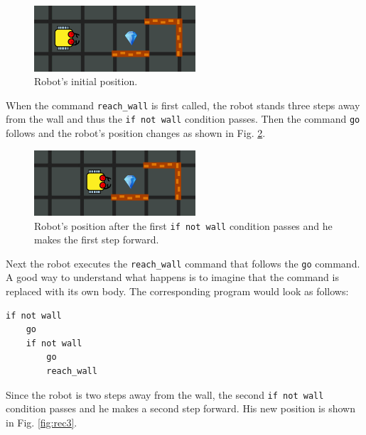 \begin{figure}[!ht]
\begin{center}
\includegraphics[width=6cm]{imgk/rec-1.png}
\end{center}
\vspace{-4mm}
\caption{Robot's initial position.}
\label{fig:rec1}
\vspace{-4mm}
\end{figure}
\noindent
When the command {\tt reach\_wall} is first called, the robot stands three steps away from the wall and 
thus the {\tt if not wall} condition passes. Then the command {\tt go} follows and the robot's 
position changes as shown in Fig. \ref{fig:rec2}. 

\begin{figure}[!ht]
\begin{center}
\includegraphics[width=6cm]{imgk/rec-2.png}
\end{center}
\vspace{-4mm}
\caption{Robot's position after the first {\tt if not wall} condition passes and he makes the first step forward.}
\label{fig:rec2}
\vspace{-4mm}
\end{figure}
\noindent
Next the robot executes the {\tt reach\_wall} command that follows the {\tt go} command. A good way to 
understand what happens is to imagine that the command is replaced with its own body. The corresponding 
program would look as follows:

\begin{verbatim}
if not wall
    go
    if not wall
        go
        reach_wall
\end{verbatim}
\noindent
Since the robot is two steps away from the wall, the second {\tt if not wall} condition passes and 
he makes a second step forward. His new position is shown in Fig. \ref{fig:rec3}.

